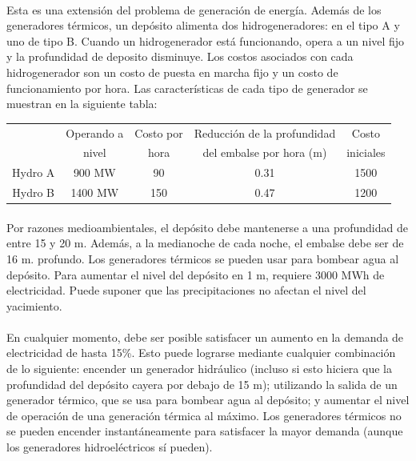 \paragraph{} Esta es una extensión del problema de generación de energía. Además de los generadores térmicos, un depósito alimenta dos hidrogeneradores: en el tipo A y uno de tipo B. Cuando un hidrogenerador está funcionando, opera a un nivel fijo y la profundidad de deposito disminuye. Los costos asociados con cada hidrogenerador son un costo de puesta en marcha fijo y un costo de funcionamiento por hora. Las características de cada tipo de generador se muestran en la siguiente tabla:

\begin{center}
\begin{tabular}{ccccc}
\hline 
 & Operando a & Costo por & Reducción de la profundidad & Costo \\ 
 & nivel & hora & del embalse  por hora (m) & iniciales \\ 
\hline 
Hydro A & 900 MW & 90 & 0.31 & 1500 \\ 
\hline 
Hydro B & 1400 MW & 150 & 0.47 & 1200 \\ 
\hline 
\end{tabular} 
\end{center}

\paragraph{} Por razones medioambientales, el depósito debe mantenerse a una profundidad de entre 15 y 20 m. Además, a la medianoche de cada noche, el embalse debe ser de 16 m. profundo. Los generadores térmicos se pueden usar para bombear agua al depósito. Para aumentar el nivel del depósito en 1 m, requiere 3000 MWh de electricidad. Puede suponer que las precipitaciones no afectan el nivel del yacimiento.
\paragraph{} En cualquier momento, debe ser posible satisfacer un aumento en la demanda de electricidad de hasta 15\%. Esto puede lograrse mediante cualquier combinación de lo siguiente: encender un generador hidráulico (incluso si esto hiciera que la profundidad del depósito cayera por debajo de 15 m); utilizando la salida de un generador térmico, que se usa para bombear agua al depósito; y aumentar el nivel de operación de una generación térmica al máximo. Los generadores térmicos no se pueden encender instantáneamente para satisfacer la mayor demanda (aunque los generadores hidroeléctricos sí pueden).


